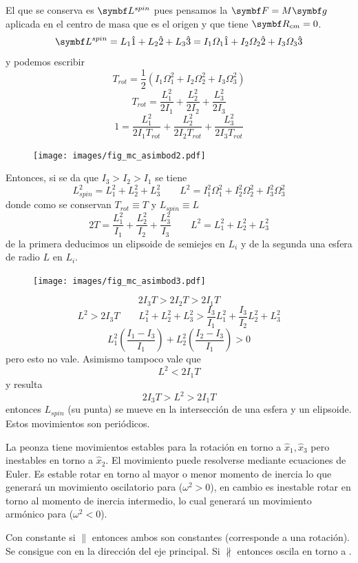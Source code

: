 \documentclass[10pt,oneside]{CBFT_book}
\begin{document}
El que se conserva es $\vb{L}^{spin}$ pues pensamos la $\vb{F}=M\vb{g}$ aplicada en el centro de masa que es el origen
y que tiene $\vb{R}_{cm}=0$.
\[
	\vb{L}^{spin} = L_1 \hat{1} + L_2 \hat{2} + L_3 \hat{3} = I_1\Omega_1 \hat{1} + I_2\Omega_2 \hat{2} + I_3\Omega_3 \hat{3}
\]
y podemos escribir
\[
	T_{rot} = \frac{1}{2} \left( I_1\Omega_1^2 + I_2\Omega_2^2 + I_3\Omega_3^2 \right)
\]
\[
	T_{rot} = \frac{L_1^2}{2 I_1} + \frac{L_2^2}{2 I_2} + \frac{L_3^2}{2 I_3}
\]
\[
	1  = \frac{L_1^2}{2 I_1 T_{rot}} + \frac{L_2^2}{2 I_2 T_{rot}} + \frac{L_3^2}{2 I_3 T_{rot}}
\]
\begin{figure}[htb]
	\begin{center}
	\texttt{[image: images/fig\_mc\_asimbod2.pdf]}	 
	\end{center}
	\caption{}
\end{figure} 
Entonces, si se da que $I_3 > I_2 > I_1$ se tiene 
\[
	L_{spin}^2 = L_1^2 + L_2^2 + L_3^2 \qquad L^2 =  I_1^2\Omega_1^2 + I_2^2\Omega_2^2 + I_3^2\Omega_3^2
\]
donde como se conservan $T_{rot} \equiv T$ y $L_{spin} \equiv L$ 
\[
	2 T = \frac{L_1^2}{I_1} + \frac{L_2^2}{I_2} + \frac{L_3^2}{I_3} \qquad L^2 = L_1^2 + L_2^2 + L_3^2
\]
de la primera deducimos un elipsoide de semiejes en $L_i$ y de la segunda una esfera de radio $L$ en $L_i$.
\begin{figure}[htb]
	\begin{center}
	\texttt{[image: images/fig\_mc\_asimbod3.pdf]}	 
	\end{center}
	\caption{}
\end{figure} 
\[
	2 I_3 T > 2 I_2 T > 2 I_1 T
\]
\[
	L^2 > 2 I_3 T	\qquad L_1^2 + L_2^2 + L_3^2 > \frac{I_3}{I_1} L_1^2 + \frac{I_3}{I_2} L_2^2  + L_3^2
\]
\[
	L_1^2 \left( \frac{I_1 - I_3}{I_1} \right) + L_2^2 \left( \frac{I_2 - I_3}{I_1} \right)  > 0
\]
pero esto no vale. Asimismo tampoco vale que 
\[
	L^2 < 2 I_1 T
\]
y resulta 
\[
	2 I_3 T > L^2 > 2 I_1 T
\]
entonces $L_{spin}$ (su punta) se mueve en la intersección de una esfera y un elipsoide.
Estos movimientos son periódicos.

La peonza tiene movimientos estables para la rotación en torno a $\hat{x}_1, \hat{x}_3$ pero inestables en
torno a $\hat{x}_2$. El movimiento puede resolverse mediante ecuaciones de Euler.
Es estable rotar en torno al mayor o menor momento de inercia lo que generará un movimiento oscilatorio
para \vb{\Omega} ($\omega^2 > 0$), en cambio es inestable rotar en torno al momento de inercia intermedio, lo cual generará
un movimiento armónico para \vb{\Omega} ($\omega^2 < 0$).

Con  constante si $\parallel$ \vb{\Omega} entonces ambos son constantes (corresponde a una rotación). Se consigue 
con \vb{\Omega} en la dirección del eje principal. Si $\nparallel$ \vb{\Omega} entonces \vb{\Omega} oscila en torno a
.



\end{document}
